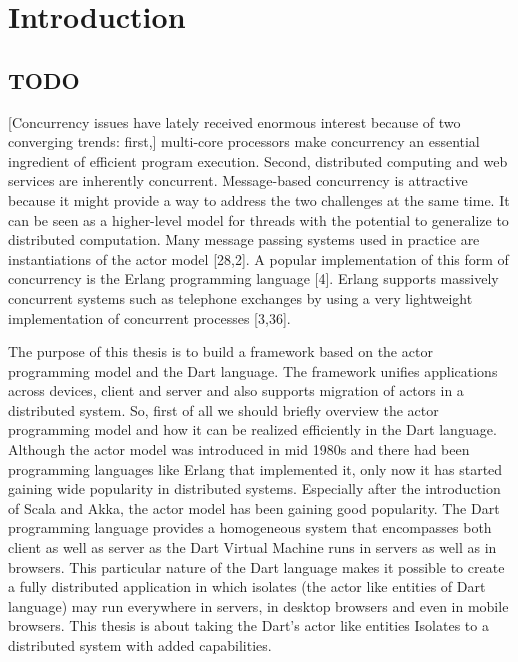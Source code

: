 \chapter{Introduction}\label{chapter:introduction}

\section{TODO}
[Concurrency issues have lately received enormous interest because of two converging trends: first,] multi-core processors make concurrency an essential ingredient of efficient program execution. Second, distributed computing and web services are inherently concurrent. Message-based concurrency is attractive because it might provide a way to address the two challenges at the same time. It can be seen as a higher-level model for threads with the potential to generalize to distributed computation. Many message passing systems used in practice are instantiations of the actor model [28,2]. A popular implementation of this form of concurrency is the Erlang programming language [4]. Erlang supports massively concurrent systems such as telephone exchanges by using a very lightweight implementation of concurrent processes [3,36].~\parencite{Haller}

The purpose of this thesis is to build a framework based on the actor programming model and the Dart language. The framework unifies applications across devices, client and server and also supports migration of actors in a distributed system. So, first of all we should briefly overview the actor programming model and how it can be realized efficiently in the Dart language. Although the actor model was introduced in mid 1980s and there had been programming languages like Erlang that implemented it, only now it has started gaining wide popularity in distributed systems. Especially after the introduction of Scala and Akka, the actor model has been gaining good popularity. The Dart programming language provides a homogeneous system that encompasses both client as well as server as the Dart Virtual Machine runs in servers as well as in browsers. This particular nature of the Dart language makes it possible to create a fully distributed application in which isolates (the actor like entities of Dart language) may run everywhere \textemdash{} in servers, in desktop browsers and even in mobile browsers.
This thesis is about taking the Dart's actor like entities \textemdash{} Isolates to a distributed system with added capabilities.
